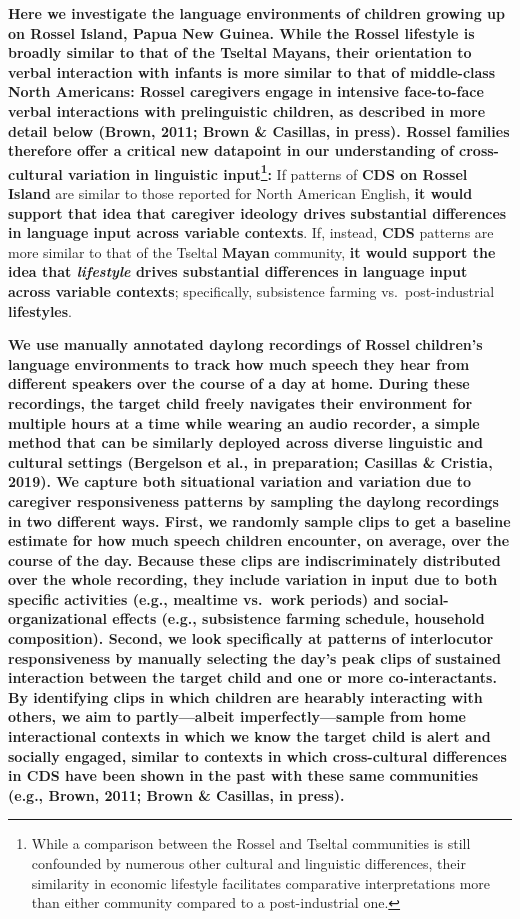 \documentclass[,man,floatsintext]{apa6}
\begin{document}
\textbf{Here we investigate the language environments of children
growing up on Rossel Island, Papua New Guinea. While the Rossel
lifestyle is broadly similar to that of the Tseltal Mayans, their
orientation to verbal interaction with infants is more similar to that
of middle-class North Americans: Rossel caregivers engage in intensive
face-to-face verbal interactions with prelinguistic children, as
described in more detail below (Brown, 2011; Brown \& Casillas, in
press). Rossel families therefore offer a critical new datapoint in our
understanding of cross-cultural variation in linguistic input\footnote{While
  a comparison between the Rossel and Tseltal communities is still
  confounded by numerous other cultural and linguistic differences,
  their similarity in economic lifestyle facilitates comparative
  interpretations more than either community compared to a
  post-industrial one.}:} If patterns of \textbf{CDS on Rossel Island}
are similar to those reported for North American English, \textbf{it
would support that idea that caregiver ideology drives substantial
differences in language input across variable contexts}. If, instead,
\textbf{CDS} patterns are more similar to that of the Tseltal
\textbf{Mayan} community, \textbf{it would support the idea that
\emph{lifestyle} drives substantial differences in language input across
variable contexts}; specifically, subsistence farming
vs.~post-industrial \textbf{lifestyles}.

\textbf{We use manually annotated daylong recordings of Rossel
children's language environments to track how much speech they hear from
different speakers over the course of a day at home. During these
recordings, the target child freely navigates their environment for
multiple hours at a time while wearing an audio recorder, a simple
method that can be similarly deployed across diverse linguistic and
cultural settings (Bergelson et al., in preparation; Casillas \&
Cristia, 2019). We capture both situational variation and variation due
to caregiver responsiveness patterns by sampling the daylong recordings
in two different ways. First, we randomly sample clips to get a baseline
estimate for how much speech children encounter, on average, over the
course of the day. Because these clips are indiscriminately distributed
over the whole recording, they include variation in input due to both
specific activities (e.g., mealtime vs.~work periods) and
social-organizational effects (e.g., subsistence farming schedule,
household composition). Second, we look specifically at patterns of
interlocutor responsiveness by manually selecting the day's peak clips
of sustained interaction between the target child and one or more
co-interactants. By identifying clips in which children are hearably
interacting with others, we aim to partly---albeit imperfectly---sample
from home interactional contexts in which we know the target child is
alert and socially engaged, similar to contexts in which cross-cultural
differences in CDS have been shown in the past with these same
communities (e.g., Brown, 2011; Brown \& Casillas, in press).}
\end{document}
